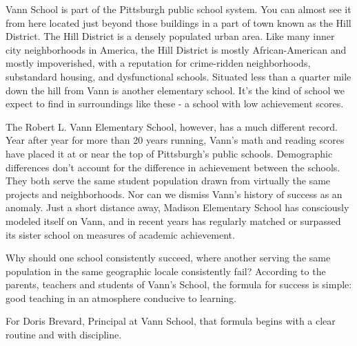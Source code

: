 Vann School is part of the Pittsburgh public school system. You can almost see it from here located just beyond those buildings in a part of town known as the Hill District. The Hill District is a densely populated urban area. Like many inner city neighborhoods in America, the Hill District is mostly African-American and mostly impoverished, with a reputation for crime-ridden neighborhoods, substandard housing, and dysfunctional schools. Situated less than a quarter mile down the hill from Vann is another elementary school. It's the kind of school we expect to find in surroundings like these - a school with low achievement scores.

The Robert L. Vann Elementary School, however, has a much different record. Year after year for more than 20 years running, Vann's math and reading scores have placed it at or near the top of Pittsburgh's public schools. Demographic differences don't account for the difference in achievement between the schools. They both serve the same student population drawn from virtually the same projects and neighborhoods. Nor can we dismiss Vann's history of success as an anomaly. Just a short distance away, Madison Elementary School has consciously modeled itself on Vann, and in recent years has regularly matched or surpassed its sister school on measures of academic achievement.

Why should one school consistently succeed, where another serving the same population in the same geographic locale consistently fail? According to the parents, teachers and students of Vann's School, the formula for success is simple: good teaching in an atmosphere conducive to learning.

For Doris Brevard, Principal at Vann School, that formula begins with a clear routine and with discipline.

